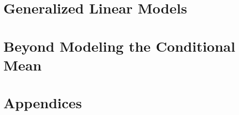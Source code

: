 \documentclass[krantz2]{krantz}
\begin{document}
    
    \part{Generalized Linear Models}
 
     
           
     
          
       

 
        \part{Beyond Modeling the Conditional Mean}
            
              


\appendix  

\part{Appendices}
\renewcommand{\theparagraph}{\Alph{chapter}.\arabic{paragraph}}

        
      
        
                
%         

 
 



\printindex
\end{document}
